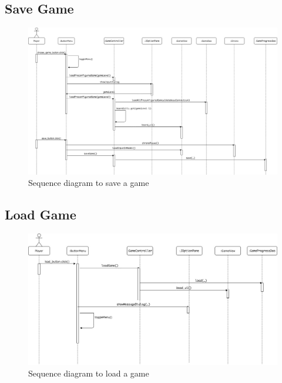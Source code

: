 \documentclass[12pt]{article}
\begin{document}
\newpage

\subsection{Save Game}
\begin{figure}[htbp]
    \includegraphics[width=1\textwidth]{saveGame}
    \caption{Sequence diagram to save a game}
    \label{fig:sequenceDiagram}
\end{figure}

\newpage

\subsection{Load Game}
\begin{figure}[htbp]
    \includegraphics[width=1\textwidth]{loadGame}
    \caption{Sequence diagram to load a game}
    \label{fig:sequenceDiagram}
\end{figure}
\end{document}

